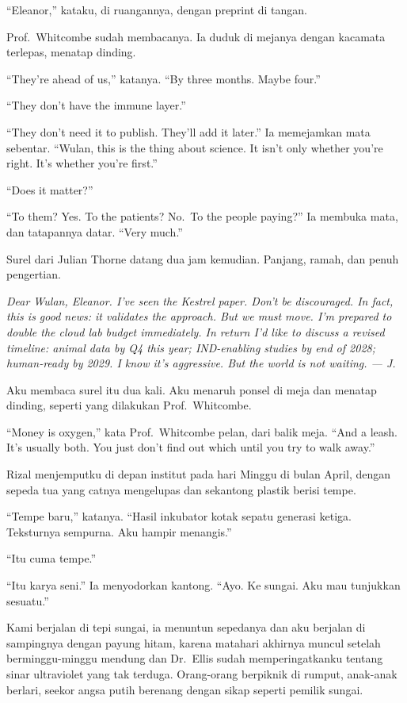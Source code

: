 \documentclass[11pt,twoside,openany]{book}
\makeatletter
\newcommand{\scenebreak}{\par\vspace{0.9em}{\centering\textsc{*\hspace{0.7em}*\hspace{0.7em}*}\par}\vspace{0.9em}\@afterindentfalse\@afterheading}
\makeatother
\begin{document}
``Eleanor,'' kataku, di ruangannya, dengan preprint di tangan.

Prof.~Whitcombe sudah membacanya. Ia duduk di mejanya dengan kacamata terlepas, menatap dinding.

``They're ahead of us,'' katanya. ``By three months. Maybe four.''

``They don't have the immune layer.''

``They don't need it to publish. They'll add it later.'' Ia memejamkan mata sebentar. ``Wulan, this is the thing about science. It isn't only whether you're right. It's whether you're first.''

``Does it matter?''

``To them? Yes. To the patients? No.~To the people paying?'' Ia membuka mata, dan tatapannya datar. ``Very much.''

Surel dari Julian Thorne datang dua jam kemudian. Panjang, ramah, dan penuh pengertian.

\emph{Dear Wulan, Eleanor. I've seen the Kestrel paper. Don't be discouraged. In fact, this is good news: it validates the approach. But we must move. I'm prepared to double the cloud lab budget immediately. In return I'd like to discuss a revised timeline: animal data by Q4 this year; IND-enabling studies by end of 2028; human-ready by 2029. I know it's aggressive. But the world is not waiting. --- J.}

Aku membaca surel itu dua kali. Aku menaruh ponsel di meja dan menatap dinding, seperti yang dilakukan Prof.~Whitcombe.

``Money is oxygen,'' kata Prof.~Whitcombe pelan, dari balik meja. ``And a leash. It's usually both. You just don't find out which until you try to walk away.''

\scenebreak
Rizal menjemputku di depan institut pada hari Minggu di bulan April, dengan sepeda tua yang catnya mengelupas dan sekantong plastik berisi tempe.

``Tempe baru,'' katanya. ``Hasil inkubator kotak sepatu generasi ketiga. Teksturnya sempurna. Aku hampir menangis.''

``Itu cuma tempe.''

``Itu karya seni.'' Ia menyodorkan kantong. ``Ayo. Ke sungai. Aku mau tunjukkan sesuatu.''

Kami berjalan di tepi sungai, ia menuntun sepedanya dan aku berjalan di sampingnya dengan payung hitam, karena matahari akhirnya muncul setelah berminggu-minggu mendung dan Dr.~Ellis sudah memperingatkanku tentang sinar ultraviolet yang tak terduga. Orang-orang berpiknik di rumput, anak-anak berlari, seekor angsa putih berenang dengan sikap seperti pemilik sungai.
\end{document}
